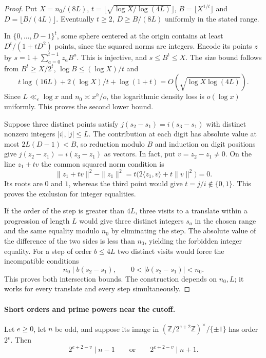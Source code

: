 \begin{proof}
Put \(X=n_0/(8L)\),
\(t=\lfloor\sqrt{\log X/\log(4L)}\rfloor\),
\(B=\lfloor X^{1/t}\rfloor\) and
\(D=\lfloor B/(4L)\rfloor\). Eventually \(t\ge2\),
\(D\ge B/(8L)\) uniformly in the stated range.

In
\(\{0,\ldots,D-1\}^t\), some sphere centered at the
origin contains at least \(D^t/(1+tD^2)\) points, since
the squared norms are integers. Encode its points \(z\)
by \(s=1+\sum_{a=0}^{t-1}z_aB^a\). This is injective,
and \(s\le B^t\le X\). The size bound follows from
\(B^t\ge X/2^t\), \(\log B\le (\log X)/t\) and
\[
 t\log(16L)+2(\log X)/t+\log(1+t)
                      =O(\sqrt{\log X\log(4L)}).
\]
Since \(L\ll_\epsilon\log x\) and \(n_0\asymp x^h/o\),
the logarithmic density loss is \(o(\log x)\) uniformly.
This proves the second lower bound.

Suppose three distinct points satisfy
\(j(s_2-s_1)=i(s_3-s_1)\) with distinct nonzero integers
\(|i|,|j|\le L\). The contribution at each digit has
absolute value at most \(2L(D-1)<B\), so reduction modulo
\(B\) and induction on digit positions give
\(j(z_2-z_1)=i(z_3-z_1)\) as vectors. In fact, put \(v=z_2-z_1\ne0\). On the line \(z_1+tv\) the common
squared norm condition is
\[
 \|z_1+tv\|^2-\|z_1\|^2
   =t\bigl(2\langle z_1,v\rangle+t\|v\|^2\bigr)=0.
\]
Its roots are \(0\) and \(1\), whereas the third point would give
\(t=j/i\notin\{0,1\}\). This proves
the exclusion for integer equalities.

If the order of the
step is greater than \(4L\), three visits to a translate
within a progression of length \(L\) would give three
distinct integers \(s_a\) in the chosen range and the
same equality modulo \(n_0\) by eliminating the step.
The absolute value of the difference of the two sides is
less than \(n_0\), yielding the forbidden integer equality.
For a step of order \(b\le4L\) two distinct visits would force the incompatible conditions
\[
 n_0\mid b(s_2-s_1),\qquad 0<|b(s_2-s_1)|<n_0.
\]
This proves both intersection
bounds. The construction depends on \(n_0,L\); it works
for every translate and every step simultaneously.

\end{proof}

\paragraph{Short orders and prime powers near the cutoff.}
\begin{auxlemma}
\label{lem:short-real-dyadic-order}
Let \(e\ge0\), let \(n\) be odd, and suppose its image in
\((\mathbb Z/2^{e+2}\mathbb Z)^\times/\{\pm1\}\) has order \(2^v\).
Then
\[
 2^{e+2-v}\mid n-1\qquad\text{or}\qquad2^{e+2-v}\mid n+1.
\]
\end{auxlemma}

